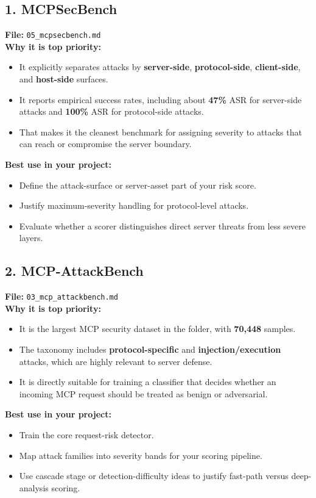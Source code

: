 \documentclass[11pt]{article}
\begin{document}
\subsection*{1. MCPSecBench}
\textbf{File:} \texttt{05\_mcpsecbench.md} \\
\textbf{Why it is top priority:}
\begin{itemize}[leftmargin=1.2em]
\item It explicitly separates attacks by \textbf{server-side}, \textbf{protocol-side}, \textbf{client-side}, and \textbf{host-side} surfaces.
\item It reports empirical success rates, including about \textbf{47\%} ASR for server-side attacks and \textbf{100\%} ASR for protocol-side attacks.
\item That makes it the cleanest benchmark for assigning severity to attacks that can reach or compromise the server boundary.
\end{itemize}
\textbf{Best use in your project:}
\begin{itemize}[leftmargin=1.2em]
\item Define the attack-surface or server-asset part of your risk score.
\item Justify maximum-severity handling for protocol-level attacks.
\item Evaluate whether a scorer distinguishes direct server threats from less severe layers.
\end{itemize}

\subsection*{2. MCP-AttackBench}
\textbf{File:} \texttt{03\_mcp\_attackbench.md} \\
\textbf{Why it is top priority:}
\begin{itemize}[leftmargin=1.2em]
\item It is the largest MCP security dataset in the folder, with \textbf{70,448} samples.
\item The taxonomy includes \textbf{protocol-specific} and \textbf{injection/execution} attacks, which are highly relevant to server defense.
\item It is directly suitable for training a classifier that decides whether an incoming MCP request should be treated as benign or adversarial.
\end{itemize}
\textbf{Best use in your project:}
\begin{itemize}[leftmargin=1.2em]
\item Train the core request-risk detector.
\item Map attack families into severity bands for your scoring pipeline.
\item Use cascade stage or detection-difficulty ideas to justify fast-path versus deep-analysis scoring.
\end{itemize}
\end{document}
